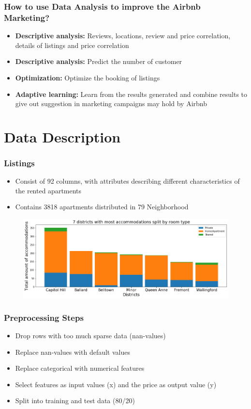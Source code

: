 \documentclass{beamer}
\begin{document}

\begin{frame}
\frametitle{How to use Data Analysis to improve the Airbnb Marketing?}
\begin{itemize}
\item \textbf{Descriptive analysis:} Reviews, locations, review and price correlation, details of listings and price correlation
\item \textbf{Descriptive analysis:} Predict the number of customer
\item \textbf{Optimization:} Optimize the booking of listings 
\item \textbf{Adaptive learning:} Learn from the results generated and combine results to give out suggestion in marketing campaigns may hold by Airbnb
\end{itemize}
\end{frame}

\section{Data Description}

\begin{frame}
\frametitle{Listings}
\begin{itemize}
\item Consist of 92 columns, with attributes describing different characteristics of the rented apartments
\item Contains 3818 apartments distributed in 79 Neighborhood
\end{itemize}
\begin{figure}
\includegraphics[width=0.8\linewidth]{photo/4_most_acc_split_by_roomtype}
\end{figure}
\end{frame}
\begin{frame}
\frametitle{Preprocessing Steps}
\begin{itemize}
\item Drop rows with too much sparse data (nan-values)
\item Replace nan-values with default values
\item Replace categorical with numerical features
\item Select features as input values (x) and the price as output value (y)
\item Split into training and test data (80/20)
\end{itemize}
\end{frame}
\end{document}
